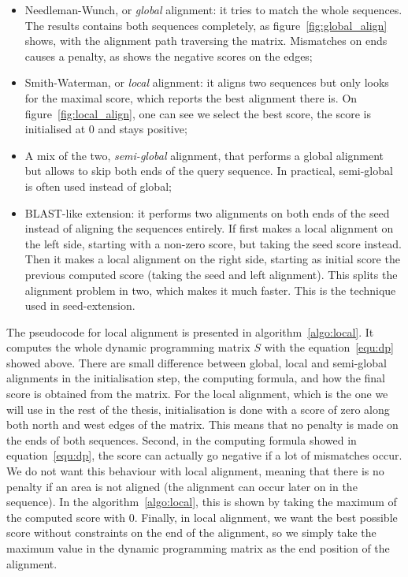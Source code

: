 \begin{itemize}
	\item Needleman-Wunch, or \emph{global} alignment: it tries to match the whole sequences. The results contains both sequences completely, as figure~\ref{fig:global_align} shows, with the alignment path traversing the matrix. Mismatches on ends causes a penalty, as shows the negative scores on the edges;
	\item Smith-Waterman, or \emph{local} alignment: it aligns two sequences but only looks for the maximal score, which reports the best alignment there is. On figure~\ref{fig:local_align}, one can see we select the best score, the score is initialised at 0 and stays positive;
	\item A mix of the two, \emph{semi-global} alignment, that performs a global alignment but allows to skip both ends of the query sequence. In practical, semi-global is often used instead of global;
	\item BLAST-like extension: it performs two alignments on both ends of the seed instead of aligning the sequences entirely. If first makes a local alignment on the left side, starting with a non-zero score, but taking the seed score instead. Then it makes a local alignment on the right side, starting as initial score the previous computed score (taking the seed and left alignment). This splits the alignment problem in two, which makes it much faster. This is the technique used in seed-extension.
\end{itemize}

The pseudocode for local alignment is presented in algorithm~\ref{algo:local}. It computes the whole dynamic programming matrix $S$ with the equation~\ref{equ:dp} showed above. There are small difference between global, local and semi-global alignments in the initialisation step, the computing formula, and how the final score is obtained from the matrix. For the local alignment, which is the one we will use in the rest of the thesis, initialisation is done with a score of zero along both north and west edges of the matrix. This means that no penalty is made on the ends of both sequences. Second, in the computing formula showed in equation~\ref{equ:dp}, the score can actually go negative if a lot of mismatches occur. We do not want this behaviour with local alignment, meaning that there is no penalty if an area is not aligned (the alignment can occur later on in the sequence). In the algorithm~\ref{algo:local}, this is shown by taking the maximum of the computed score with 0. Finally, in local alignment, we want the best possible score without constraints on the end of the alignment, so we simply take the maximum value in the dynamic programming matrix as the end position of the alignment.

